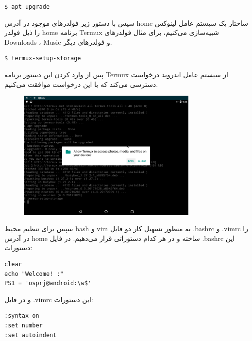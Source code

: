 \documentclass{article}
\begin{document}
\begin{latin}
\begin{verbatim}
$ apt upgrade
\end{verbatim}
\end{latin}

سپس با دستور زیر فولدر‌های موجود در آدرس home ساختار یک سیستم عامل لینوکس را ذیل فولدر home برنامه Termux شبیه‌سازی می‌کنیم، برای مثال فولدر‌های Downloads ، Music و فولدر‌های دیگر.

\begin{latin}
\begin{verbatim}
$ termux-setup-storage
\end{verbatim}
\end{latin}

پس از وارد کردن این دستور برنامه Termux از سیستم عامل اندروید درخواست دسترسی می‌کند که با این درخواست موافقت می‌کنیم.

\begin{figure}[h]
	\centering	
	\includegraphics[width = 0.8\textwidth]{images/package6.png}
\end{figure}

سپس برای تنظیم محیط bash و vim به منظور تسهیل کار دو فایل .bashrc و .vimrc را در آدرس home ساخته و در هر کدام دستوراتی قرار می‌دهیم. در فایل .bashrc این دستورات:

\begin{latin}
\begin{verbatim}
clear
echo "Welcome! :"
PS1 = 'osprj@android:\w$'
\end{verbatim}
\end{latin}

و در فایل .vimrc این دستورات:

\begin{latin}
\begin{verbatim}
:syntax on
:set number
:set autoindent
\end{verbatim}
\end{latin}
\end{document}
